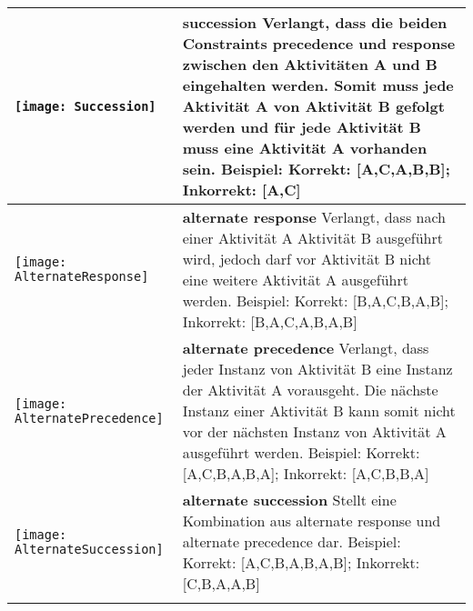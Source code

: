 \begin{longtable}{|p{}|p{}|}
\begin{center}
  \texttt{[image: Succession]} %
    \end{center}&
\textbf{succession} \newline Verlangt, dass die beiden Constraints precedence und response zwischen den Aktivitäten A und B eingehalten werden. Somit muss jede Aktivität A von Aktivität B gefolgt werden und für jede Aktivität B muss eine Aktivität A vorhanden sein. \newline
Beispiel: Korrekt: [A,C,A,B,B]; Inkorrekt: [A,C]\\

\hline

 \begin{center}

  \texttt{[image: AlternateResponse]} %
    \end{center} &
\textbf{alternate response} \newline  Verlangt, dass nach einer Aktivität A Aktivität B ausgeführt wird, jedoch darf vor Aktivität B nicht eine weitere Aktivität A ausgeführt werden. \newline
Beispiel: Korrekt: [B,A,C,B,A,B]; Inkorrekt: [B,A,C,A,B,A,B] \\

\hline

\begin{center}

  \texttt{[image: AlternatePrecedence]} %
    \end{center} &
\textbf{alternate precedence}\newline
  Verlangt, dass jeder Instanz von Aktivität B eine Instanz der Aktivität A vorausgeht. Die nächste Instanz einer Aktivität B kann somit nicht vor der nächsten Instanz von Aktivität A ausgeführt werden.
  \newline
  Beispiel: Korrekt: [A,C,B,A,B,A]; Inkorrekt: [A,C,B,B,A]\\
\hline
\begin{center}

  \texttt{[image: AlternateSuccession]} %
    \end{center}&
\textbf{alternate succession} \newline
 Stellt eine Kombination aus alternate response und alternate precedence dar. \newline
  Beispiel:  Korrekt: [A,C,B,A,B,A,B]; Inkorrekt: [C,B,A,A,B] \\
\hline
\begin{center}


\end{center}
\end{longtable}
